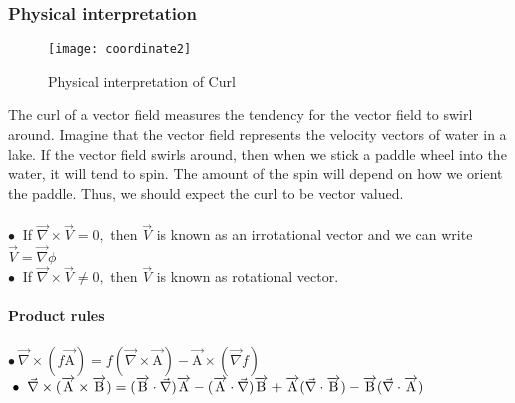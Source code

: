 \subsubsection{Physical interpretation}
\begin{figure}[H]
	\begin{center}
		\texttt{[image: coordinate2]}
	\end{center}
	\caption{Physical interpretation of Curl}
\end{figure}
The curl of a vector field measures the tendency for the vector field to swirl around. Imagine that the vector field represents the velocity vectors of water in a lake. If the vector field swirls around, then when we stick a paddle wheel into the water, it will tend to spin. The amount of the spin will depend on how we orient the paddle. Thus, we should expect the curl to be vector valued.\\
\\$\bullet \ $ If $\vec{\nabla} \times \vec{V}=0,$ then $\vec{V}$ is known as an irrotational vector and we can write $\vec{V}=\vec{\nabla} \phi$
\\$\bullet \ $ If $\vec{\nabla} \times \vec{V} \neq 0,$ then $\vec{V}$ is known as rotational vector.
\\\\\textbf{Product rules}\\
\\$\bullet \ \vec{\nabla} \times(f \overrightarrow{\mathrm{A}})=f(\vec{\nabla} \times \overrightarrow{\mathrm{A}})-\overrightarrow{\mathrm{A}} \times(\vec{\nabla} f)$
$\\\bullet \ \vec{\nabla} \times(\overrightarrow{\mathrm{A}} \times \overrightarrow{\mathrm{B}})=(\overrightarrow{\mathrm{B}} \cdot \vec{\nabla} ) \overrightarrow{\mathrm{A}}-(\overrightarrow{\mathrm{A}} \cdot \vec{\nabla}) \overrightarrow{\mathrm{B}}+\overrightarrow{\mathrm{A}}(\vec{\nabla} \cdot \overrightarrow{\mathrm{B}})-\overrightarrow{\mathrm{B}}(\vec{\nabla} \cdot \overrightarrow{\mathrm{A}})$

